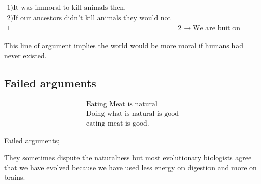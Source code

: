 \documentclass[12pt]{report}
\numberwithin{equation}{section}
\begin{document}
\begin{align}
1) \text{It was immoral to kill animals then.} \\
2) \text{If our ancestors didn't kill animals they would not have evolved as they did} \\
1&2 \rightarrow \text{We are buit on immorality}
\end{align}

This line of argument implies the world would be more moral if humans had never existed. 


\subsection{Failed arguments}

\begin{align}
\text{Eating Meat is natural} \\
\text{Doing what is natural is good} \\
\text{eating meat is good.}
\end{align}





Failed arguments;


They sometimes dispute the naturalness but most evolutionary biologists agree that we have evolved because we have used less energy on digestion and more on brains.  


 


\end{document}
